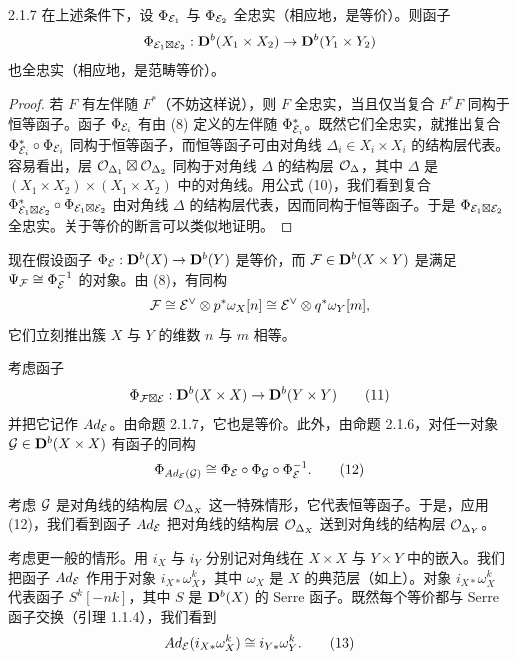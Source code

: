 \begin{proposition}{2.1.7}
在上述条件下，设 $\Phi_{\mathcal{E}_1}$ 与 $\Phi_{\mathcal{E}_2}$ 全忠实（相应地，是等价）。则函子
\begin{equation*}
\Phi_{\mathcal{E}_1\boxtimes\mathcal{E}_2}:\mathbf{D}^{b}(X_1\times X_2)\to\mathbf{D}^{b}(Y_1\times Y_2)
\end{equation*}
也全忠实（相应地，是范畴等价）。
\end{proposition}

\begin{proof}
若 $F$ 有左伴随 $F^{*}$（不妨这样说），则 $F$ 全忠实，当且仅当复合 $F^{*}F$ 同构于恒等函子。函子 $\Phi_{\mathcal{E}_i}$ 有由 (8) 定义的左伴随 $\Phi^{*}_{\mathcal{E}_i}$。既然它们全忠实，就推出复合 $\Phi^{*}_{\mathcal{E}_i}\circ\Phi_{\mathcal{E}_i}$ 同构于恒等函子，而恒等函子可由对角线 $\Delta_i\in X_i\times X_i$ 的结构层代表。容易看出，层 $\mathcal{O}_{\Delta_1}\boxtimes\mathcal{O}_{\Delta_2}$ 同构于对角线 $\Delta$ 的结构层 $\mathcal{O}_{\Delta}$，其中 $\Delta$ 是 $(X_1\times X_2)\times(X_1\times X_2)$ 中的对角线。用公式 (10)，我们看到复合 $\Phi^{*}_{\mathcal{E}_1\boxtimes\mathcal{E}_2}\circ\Phi_{\mathcal{E}_1\boxtimes\mathcal{E}_2}$ 由对角线 $\Delta$ 的结构层代表，因而同构于恒等函子。于是 $\Phi_{\mathcal{E}_1\boxtimes\mathcal{E}_2}$ 全忠实。关于等价的断言可以类似地证明。
\end{proof}

现在假设函子 $\Phi_{\mathcal{E}}:\mathbf{D}^{b}(X)\to\mathbf{D}^{b}(Y)$ 是等价，而 $\mathcal{F}\in\mathbf{D}^{b}(X\times Y)$ 是满足 $\Psi_{\mathcal{F}}\cong\Phi_{\mathcal{E}}^{-1}$ 的对象。由 (8)，有同构
\begin{equation*}
\mathcal{F}\cong\mathcal{E}^{\vee}\otimes p^{*}\omega_X[n]\cong\mathcal{E}^{\vee}\otimes q^{*}\omega_Y[m],
\end{equation*}
它们立刻推出簇 $X$ 与 $Y$ 的维数 $n$ 与 $m$ 相等。

考虑函子
\begin{equation}
\Phi_{\mathcal{F}\boxtimes\mathcal{E}}:\mathbf{D}^{b}(X\times X)\to\mathbf{D}^{b}(Y\times Y) \tag{11}
\end{equation}
并把它记作 $Ad_{\mathcal{E}}$。由命题 2.1.7，它也是等价。此外，由命题 2.1.6，对任一对象 $\mathcal{G}\in\mathbf{D}^{b}(X\times X)$ 有函子的同构
\begin{equation}
\Phi_{Ad_{\mathcal{E}}(\mathcal{G})}\cong\Phi_{\mathcal{E}}\circ\Phi_{\mathcal{G}}\circ\Phi_{\mathcal{E}}^{-1}. \tag{12}
\end{equation}

考虑 $\mathcal{G}$ 是对角线的结构层 $\mathcal{O}_{\Delta_X}$ 这一特殊情形，它代表恒等函子。于是，应用 (12)，我们看到函子 $Ad_{\mathcal{E}}$ 把对角线的结构层 $\mathcal{O}_{\Delta_X}$ 送到对角线的结构层 $\mathcal{O}_{\Delta_Y}$。

考虑更一般的情形。用 $i_X$ 与 $i_Y$ 分别记对角线在 $X\times X$ 与 $Y\times Y$ 中的嵌入。我们把函子 $Ad_{\mathcal{E}}$ 作用于对象 $i_{X*}\omega^{k}_{X}$，其中 $\omega_X$ 是 $X$ 的典范层（如上）。对象 $i_{X*}\omega^{k}_{X}$ 代表函子 $S^{k}[-nk]$，其中 $S$ 是 $\mathbf{D}^{b}(X)$ 的 Serre 函子。既然每个等价都与 Serre 函子交换（引理 1.1.4），我们看到
\begin{equation}
Ad_{\mathcal{E}}(i_{X*}\omega^{k}_{X})\cong i_{Y*}\omega^{k}_{Y}. \tag{13}
\end{equation}

